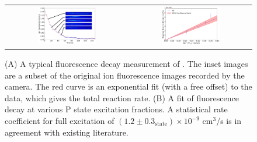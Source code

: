 \begin{figure}[H]
	\centering
	\begin{tabular}{cc}
		\includegraphics[width=0.5\textwidth]{images/Be_H2_decay_images.png} &
		\includegraphics[width=0.5\textwidth]{images/Be_H2_fit.png}
	\end{tabular}
	\caption{(A) A typical fluorescence decay measurement of . The inset images are a subset of the original ion fluorescence images recorded by the camera. The red curve is an exponential fit (with a free offset) to the data, which gives the total reaction rate. (B) A fit of  fluorescence decay at various P state excitation fractions. A statistical rate coefficient for full excitation of $(1.2 \pm 0.3_{\text{state}}) \times 10^{-9}$ cm$^3$/s is in agreement with existing literature.}
	\label{fig: Be+H2 calibration}
\end{figure}